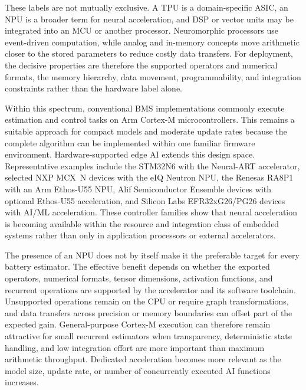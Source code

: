 \documentclass[
    a4paper,
    12pt,
    titlepage,
    bibliography=totoc,
    twoside=on,
    parskip=false,
    numbers=noenddot,
    cleardoublepage=empty,
    DIV=12,
    BCOR=12.0mm,
    headheight=36pt,
    headings=openright
]{scrreprt}
\begin{document}
These labels are not mutually exclusive. A TPU is a domain-specific ASIC, an NPU is a broader term for neural acceleration, and DSP or vector units may be integrated into an MCU or another processor. Neuromorphic processors use event-driven computation, while analog and in-memory concepts move arithmetic closer to the stored parameters to reduce costly data transfers.\autocite{daviesLoihiNeuromorphicManycore2018,sebastianMemoryDevicesApplications2020} For deployment, the decisive properties are therefore the supported operators and numerical formats, the memory hierarchy, data movement, programmability, and integration constraints rather than the hardware label alone.

Within this spectrum, conventional BMS implementations commonly execute estimation and control tasks on Arm Cortex-M microcontrollers. This remains a suitable approach for compact models and moderate update rates because the complete algorithm can be implemented within one familiar firmware environment. Hardware-supported edge AI extends this design space. Representative examples include the STM32N6 with the Neural-ART accelerator, selected NXP MCX~N devices with the eIQ Neutron NPU, the Renesas RA8P1 with an Arm Ethos-U55 NPU, Alif Semiconductor Ensemble devices with optional Ethos-U55 acceleration, and Silicon Labs EFR32xG26/PG26 devices with AI/ML acceleration.\autocite{zotero-item-518,zotero-item-519,zotero-item-520,zotero-item-522,zotero-item-523} These controller families show that neural acceleration is becoming available within the resource and integration class of embedded systems rather than only in application processors or external accelerators.

The presence of an NPU does not by itself make it the preferable target for every battery estimator. The effective benefit depends on whether the exported operators, numerical formats, tensor dimensions, activation functions, and recurrent operations are supported by the accelerator and its software toolchain. Unsupported operations remain on the CPU or require graph transformations, and data transfers across precision or memory boundaries can offset part of the expected gain. General-purpose Cortex-M execution can therefore remain attractive for small recurrent estimators when transparency, deterministic state handling, and low integration effort are more important than maximum arithmetic throughput. Dedicated acceleration becomes more relevant as the model size, update rate, or number of concurrently executed AI functions increases.
\end{document}
